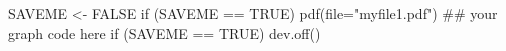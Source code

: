 \begin{Schunk}
\begin{Sinput}
 SAVEME <- FALSE
 if (SAVEME == TRUE) pdf(file="myfile1.pdf")
 ## your graph code here
 if (SAVEME == TRUE) dev.off()
\end{Sinput}
\end{Schunk}
